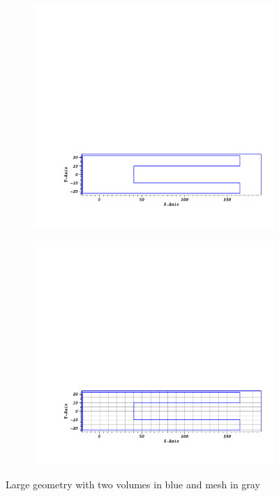 \begin{figure}[!h]
    \begin{subfigure}{1\textwidth}
        \centering
        \includegraphics[scale=0.4, trim={4cm 3cm 1cm 22cm}, clip]{figs/mesh_geom_larger.png}
        \caption{}
        \label{fig:large_geom1}
    \end{subfigure}
    \begin{subfigure}{1\textwidth}
        \centering
        \includegraphics[scale=0.4, trim={4cm 3cm 1cm 22cm}, clip]{figs/mesh_geom_mesh_larger.png}
        \caption{}
        \label{fig:large_geom2}
    \end{subfigure}
    \caption{Large geometry with two volumes in blue and mesh in gray}
    \label{fig:large_geom}
\end{figure}


